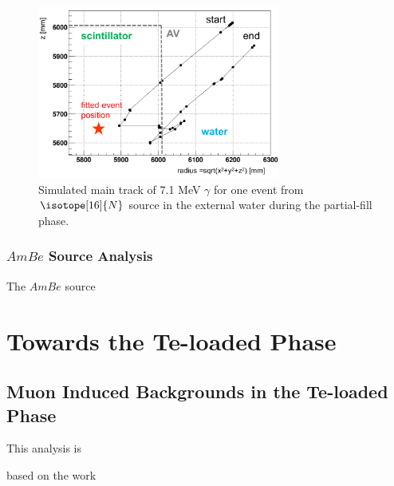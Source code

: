 \begin{figure}[!htb]
	\centering
	\includegraphics[width=8cm]{track_partial_N16.png}
	\caption{Simulated main track of 7.1 MeV $\gamma$ for one event from $\isotope[16]{N}$ source in the external water during the partial-fill phase.}	
	\label{track_partial_N16}
\end{figure}








\subsubsection{$AmBe$ Source Analysis}

The $AmBe$ source










\section{Towards the Te-loaded Phase}

\subsection{Muon Induced Backgrounds in the Te-loaded Phase}
This analysis is 

based on the work



